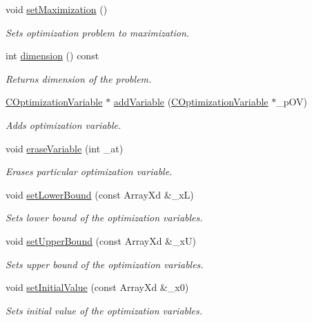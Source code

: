 \begin{DoxyCompactItemize}
void \hyperlink{class_c_optimization_problem_a20b7943d855d629bdfcf111e0ff534b6}{set\-Maximization} ()
\begin{DoxyCompactList}\small\item\em Sets optimization problem to maximization. \end{DoxyCompactList}\item 
int \hyperlink{class_c_optimization_problem_a5390a1e20ac8312e02f5de27fc575bdd}{dimension} () const 
\begin{DoxyCompactList}\small\item\em Returns dimension of the problem. \end{DoxyCompactList}\item 
\hyperlink{class_c_optimization_variable}{C\-Optimization\-Variable} $\ast$ \hyperlink{class_c_optimization_problem_adff750a5b896e95a8328627110b66da7}{add\-Variable} (\hyperlink{class_c_optimization_variable}{C\-Optimization\-Variable} $\ast$\-\_\-p\-O\-V)
\begin{DoxyCompactList}\small\item\em Adds optimization variable. \end{DoxyCompactList}\item 
void \hyperlink{class_c_optimization_problem_a7f18cd310761a871d13c914ea803e75a}{erase\-Variable} (int \-\_\-at)
\begin{DoxyCompactList}\small\item\em Erases particular optimization variable. \end{DoxyCompactList}\item 
void \hyperlink{class_c_optimization_problem_acb9cf75e7dcce19ddde928f73ee2a6dd}{set\-Lower\-Bound} (const Array\-Xd \&\-\_\-x\-L)
\begin{DoxyCompactList}\small\item\em Sets lower bound of the optimization variables. \end{DoxyCompactList}\item 
void \hyperlink{class_c_optimization_problem_a7fc1c240a370dd6f534d9feac9400581}{set\-Upper\-Bound} (const Array\-Xd \&\-\_\-x\-U)
\begin{DoxyCompactList}\small\item\em Sets upper bound of the optimization variables. \end{DoxyCompactList}\item 
void \hyperlink{class_c_optimization_problem_a181f9b453ce641a6eb08f0fee1025bd1}{set\-Initial\-Value} (const Array\-Xd \&\-\_\-x0)
\begin{DoxyCompactList}\small\item\em Sets initial value of the optimization variables. \end{DoxyCompactList}\item 

\end{DoxyCompactItemize}
